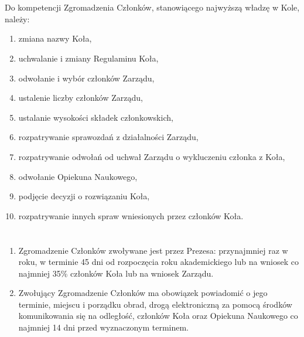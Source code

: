 \documentclass[a4paper]{article}
\begin{document}
\section{}
Do kompetencji Zgromadzenia Członków, stanowiącego najwyższą władzę w Kole, należy:
  \begin{enumerate}[label=\alph*)]
  \item zmiana nazwy Koła,
  \item uchwalanie i zmiany Regulaminu Koła,
  \item odwołanie i wybór członków Zarządu, 
  \item ustalenie liczby członków Zarządu,
  \item ustalanie wysokości składek członkowskich,
  \item rozpatrywanie sprawozdań z działalności Zarządu,
  \item rozpatrywanie odwołań od uchwał Zarządu o wykluczeniu członka z Koła,
  \item odwołanie Opiekuna Naukowego,
  \item podjęcie decyzji o rozwiązaniu Koła,
  \item rozpatrywanie innych spraw wniesionych przez członków Koła.
  \end{enumerate}

\section{}
\label{Tryb}
\begin{enumerate}
\item Zgromadzenie Członków zwoływane jest przez Prezesa: przynajmniej raz w roku, w terminie 45 dni od rozpoczęcia roku akademickiego lub na wniosek co najmniej 35\% członków Koła lub na wniosek Zarządu.
\item Zwołujący Zgromadzenie Członków ma obowiązek powiadomić o jego terminie, miejscu i porządku obrad, drogą elektroniczną za pomocą środków komunikowania się na odległość, członków Koła oraz Opiekuna Naukowego co najmniej 14 dni przed wyznaczonym terminem.
\end{enumerate}

\section{}
\end{document}
